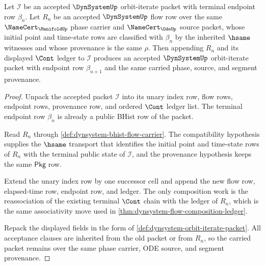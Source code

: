 \begin{theorem}
\label{thm:dynsystem-orbit-iterate-carrier-closure}
Let $\mathcal{I}$ be an accepted $\DynSystemUp$ orbit-iterate packet with terminal endpoint row $\beta_n$. Let $R_n$ be an accepted $\DynSystemUp$ flow row over the same $\NameCert_{\ManifoldUp}$ phase carrier and $\NameCert_{\OdeUp}$ source packet, whose initial point and time-state rows are classified with $\beta_n$ by the inherited $\hsame$ witnesses and whose provenance is the same $\rho$. Then appending $R_n$ and its displayed $\Cont$ ledger to $\mathcal{I}$ produces an accepted $\DynSystemUp$ orbit-iterate packet with endpoint row $\beta_{n+1}$ and the same carried phase, source, and segment provenance.
\end{theorem}
\begin{proof}
Unpack the accepted packet $\mathcal{I}$ into its unary index row, flow rows, endpoint rows, provenance row, and ordered $\Cont$ ledger list. The terminal endpoint row $\beta_n$ is already a public BHist row of the packet.

Read $R_n$ through \autoref{def:dynsystem-bhist-flow-carrier}. The compatibility hypothesis supplies the $\hsame$ transport that identifies the initial point and time-state rows of $R_n$ with the terminal public state of $\mathcal{I}$, and the provenance hypothesis keeps the same $\mathsf{Pkg}$ row.

Extend the unary index row by one successor cell and append the new flow row, elapsed-time row, endpoint row, and ledger. The only composition work is the reassociation of the existing terminal $\Cont$ chain with the ledger of $R_n$, which is the same associativity move used in \autoref{thm:dynsystem-flow-composition-ledger}.

Repack the displayed fields in the form of \autoref{def:dynsystem-orbit-iterate-packet}. All acceptance clauses are inherited from the old packet or from $R_n$, so the carried packet remains over the same phase carrier, ODE source, and segment provenance.
\end{proof}

